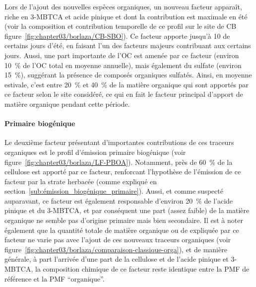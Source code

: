 Lors de l'ajout des nouvelles espèces organiques, un nouveau facteur apparaît, riche en
3-MBTCA et acide pinique et dont la contribution est maximale en été (voir la composition
et contribution temporelle de ce profil sur le site de CB
figure~\ref{fig:chapter03/borlaza/CB-SBO}).  Ce facteur apporte jusqu'à \SI{10}{\ugm} de
\PMdix{} certains jours d'été, en faisant l'un des facteurs majeurs contribuant aux
\PMdix{} certains jours.  Aussi, une part importante de l'OC est amenée par ce facteur
(environ \SI{10}{\percent} de l'OC total en moyenne annuelle), mais également du sulfate (environ
\SI{15}{\percent}), suggérant la présence de composés organiques sulfatés.  Ainsi, en
moyenne estivale, c'est entre \SI{20}{\percent} et \SI{40}{\percent} de la matière
organique qui sont apportés par ce facteur selon le site considéré, ce qui en fait le
facteur principal d'apport de matière organique pendant cette période.

\paragraph{Primaire biogénique}%
\label{par:primaire_biogénique}

Le deuxième facteur présentant d'importantes contributions de ces traceurs organiques est
le profil d'émission primaire biogénique (voir
figure~\ref{fig:chapter03/borlaza/LF-PBOA}). Notamment, près de \SI{60}{\percent} de la
cellulose est apporté par ce facteur, renforcant l'hypothèse de l'émission de ce facteur
par la strate herbacée (comme expliqué en
section~\ref{sub:émission_biogénique_primaire}). Aussi, et comme suspecté auparavant, ce
facteur est également responsable d'environ \SI{20}{\percent} de l'acide pinique et du
3-MBTCA, et par conséquent une part (assez faible) de la matière organique ne semble pas
d'origine primaire mais bien secondaire. Il est à noter également que la quantité totale
de matière organique ou de \PMdix{} expliquée par ce facteur ne varie pas avec l'ajout de
ces nouveaux traceurs organiques (voir
figure~\ref{fig:chapter03/borlaza/comparaison-classique-orga}), et de manière générale, à
part l'arrivée d'une part de la cellulose et de l'acide pinique et 3-MBTCA, la composition chimique de
ce facteur reste identique entre la PMF de référence et la PMF ``organique''.

